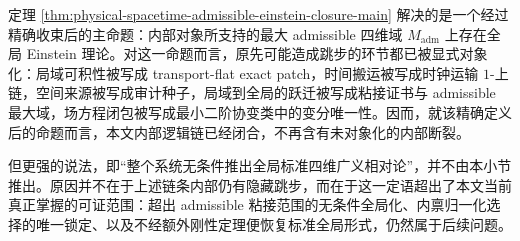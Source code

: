 

\begin{remark}[本小节命题的精确边界]\label{rem:physical-spacetime-admissible-einstein-closure-boundary}
定理 \ref{thm:physical-spacetime-admissible-einstein-closure-main} 解决的是一个经过精确收束后的主命题：内部对象所支持的最大 admissible 四维域 \(M_{\mathrm{adm}}\) 上存在全局 Einstein 理论。对这一命题而言，原先可能造成跳步的环节都已被显式对象化：局域可积性被写成 transport-flat exact patch，时间搬运被写成时钟运输 \(1\)-上链，空间来源被写成审计种子，局域到全局的跃迁被写成粘接证书与 admissible 最大域，场方程闭包被写成最小二阶协变类中的变分唯一性。因而，就该精确定义后的命题而言，本文内部逻辑链已经闭合，不再含有未对象化的内部断裂。

但更强的说法，即“整个系统无条件推出全局标准四维广义相对论”，并不由本小节推出。原因并不在于上述链条内部仍有隐藏跳步，而在于这一定语超出了本文当前真正掌握的可证范围：超出 admissible 粘接范围的无条件全局化、内禀归一化选择的唯一锁定、以及不经额外刚性定理便恢复标准全局形式，仍然属于后续问题。
\end{remark}
